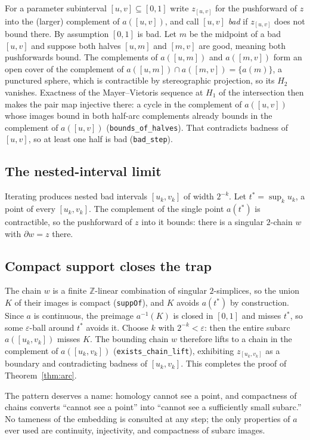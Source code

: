\documentclass[11pt]{article}
\theoremstyle{definition}
\newcommand{\Z}{\mathbb{Z}}
\newcommand{\lean}[1]{\texttt{#1}}
\begin{document}
For a parameter subinterval $[u, v] \subseteq [0,1]$ write $z_{[u,v]}$ for the pushforward of $z$ into the (larger) complement of $a([u,v])$, and call $[u,v]$ \emph{bad} if $z_{[u,v]}$ does not bound there. By assumption $[0,1]$ is bad. Let $m$ be the midpoint of a bad $[u,v]$ and suppose both halves $[u,m]$ and $[m,v]$ are good, meaning both pushforwards bound. The complements of $a([u,m])$ and $a([m,v])$ form an open cover of the complement of $a([u,m]) \cap a([m,v]) = \{a(m)\}$, a punctured sphere, which is contractible by stereographic projection, so its $H_2$ vanishes. Exactness of the Mayer--Vietoris sequence at $H_1$ of the intersection then makes the pair map injective there: a cycle in the complement of $a([u,v])$ whose images bound in both half-arc complements already bounds in the complement of $a([u,v])$ (\lean{bounds\_of\_halves}). That contradicts badness of $[u,v]$, so at least one half is bad (\lean{bad\_step}).

\subsection{The nested-interval limit}

Iterating produces nested bad intervals $[u_k, v_k]$ of width $2^{-k}$. Let $t^\ast = \sup_k u_k$, a point of every $[u_k, v_k]$. The complement of the single point $a(t^\ast)$ is contractible, so the pushforward of $z$ into it bounds: there is a singular $2$-chain $w$ with $\partial w = z$ there.

\subsection{Compact support closes the trap}

The chain $w$ is a finite $\Z$-linear combination of singular $2$-simplices, so the union $K$ of their images is compact (\lean{suppOf}), and $K$ avoids $a(t^\ast)$ by construction. Since $a$ is continuous, the preimage $a^{-1}(K)$ is closed in $[0,1]$ and misses $t^\ast$, so some $\varepsilon$-ball around $t^\ast$ avoids it. Choose $k$ with $2^{-k} < \varepsilon$: then the entire subarc $a([u_k, v_k])$ misses $K$. The bounding chain $w$ therefore lifts to a chain in the complement of $a([u_k, v_k])$ (\lean{exists\_chain\_lift}), exhibiting $z_{[u_k, v_k]}$ as a boundary and contradicting badness of $[u_k, v_k]$. This completes the proof of Theorem~\ref{thm:arc}.

The pattern deserves a name: homology cannot see a point, and compactness of chains converts ``cannot see a point'' into ``cannot see a sufficiently small subarc.'' No tameness of the embedding is consulted at any step; the only properties of $a$ ever used are continuity, injectivity, and compactness of subarc images.
\end{document}
